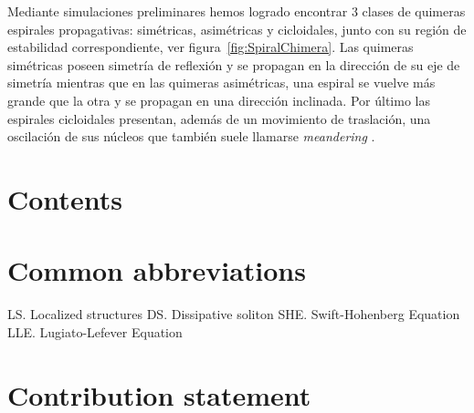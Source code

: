 Mediante simulaciones preliminares hemos logrado encontrar 3 clases de quimeras espirales propagativas: simétricas, asimétricas y cicloidales, junto con su región de estabilidad correspondiente, ver figura~\ref{fig:SpiralChimera}. Las quimeras simétricas poseen simetría de reflexión y se propagan en la dirección de su eje de simetría mientras que en las quimeras asimétricas, una espiral se vuelve más grande que la otra y se propagan en una dirección inclinada. Por último las espirales cicloidales presentan, además de un movimiento de traslación, una oscilación de sus núcleos que también suele llamarse {\em meandering} \cite{SC:Bataille}.

\section{Contents}

\section{Common abbreviations}

LS. Localized structures
DS. Dissipative soliton
SHE. Swift-Hohenberg Equation
LLE. Lugiato-Lefever Equation
\section{Contribution statement}